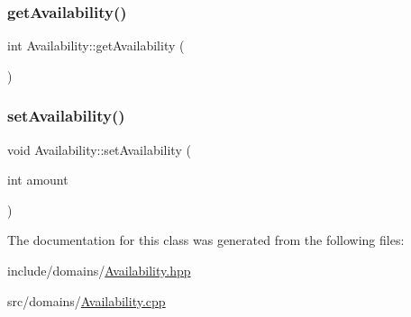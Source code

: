 \subsubsection{\texorpdfstring{getAvailability()}{getAvailability()}}
{\footnotesize\ttfamily int Availability\+::get\+Availability (\begin{DoxyParamCaption}{ }\end{DoxyParamCaption})}

\mbox{\label{class_availability_a315634988dad6624afc1330bc77e08ae}} 
\subsubsection{\texorpdfstring{setAvailability()}{setAvailability()}}
{\footnotesize\ttfamily void Availability\+::set\+Availability (\begin{DoxyParamCaption}\item[{int}]{amount }\end{DoxyParamCaption})}



The documentation for this class was generated from the following files\+:\begin{DoxyCompactItemize}
\item 
include/domains/\mbox{\hyperlink{_availability_8hpp}{Availability.\+hpp}}\item 
src/domains/\mbox{\hyperlink{_availability_8cpp}{Availability.\+cpp}}\end{DoxyCompactItemize}
